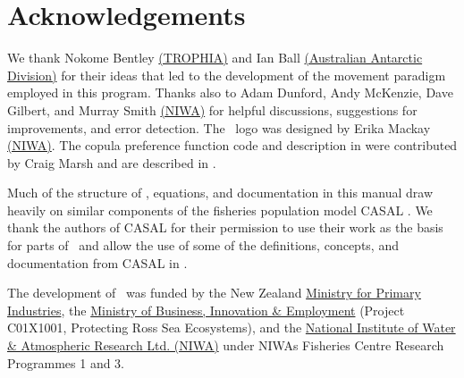 \section{Acknowledgements\label{sec:acknowledgements}}

We thank Nokome Bentley \href{http://www.trophia.co.nz}{(TROPHIA)} and Ian Ball \href{http://www.aad.gov.au}{(Australian Antarctic Division)} for their ideas that led to the development of the movement paradigm employed in this program. Thanks also to Adam Dunford, Andy McKenzie, Dave Gilbert, and Murray Smith \href{http://www.niwa.co.nz}{(NIWA)} for helpful discussions, suggestions for improvements, and error detection. The \SPM\ logo was designed by Erika Mackay \href{http://www.niwa.co.nz}{(NIWA)}. The copula preference function code and description in \SPM were contributed by Craig Marsh and are described in \cite{Marsh2015}.

Much of the structure of \SPM, equations, and documentation in this manual draw heavily on similar components of the fisheries population model CASAL \citep{1388}. We thank the authors of CASAL for their permission to use their work as the basis for parts of \SPM\ and allow the use of some of the definitions, concepts, and documentation from CASAL in \SPM. 

The development of \SPM\ was funded by the New Zealand \href{http://www.mpi.govt.nz}{Ministry for Primary Industries}, the \href{http://www.msi.govt.nz}{Ministry of Business, Innovation \& Employment} (Project C01X1001, Protecting Ross Sea Ecosystems), and the \href{http://www.niwa.co.nz}{National Institute of Water \& Atmospheric Research Ltd. (NIWA)} under NIWAs Fisheries Centre Research Programmes 1 and 3. 
